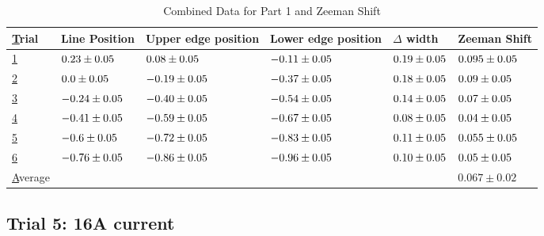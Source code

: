 \begin{table}
    \begin{adjustwidth}{-100pt}{-100pt}
        \centering
        \begin{tabular}{|l|l|l|l|l|l|}
            \hline
            {\ul Trial}   & Line Position                & Upper edge position          & Lower edge position          & $\Delta$ width              & Zeeman Shift                 \\ \hline
            {\ul 1}       & $0.23 \pm 0.05$  & $0.08 \pm 0.05$  & $-0.11 \pm 0.05$ & $0.19 \pm 0.05$ & $0.095 \pm 0.05$ \\ \hline
            {\ul 2}       & $0.0 \pm 0.05$   & $-0.19 \pm 0.05$ & $-0.37 \pm 0.05$ & $0.18 \pm 0.05$ & $0.09 \pm 0.05$  \\ \hline
            {\ul 3}       & $-0.24 \pm 0.05$ & $-0.40 \pm 0.05$ & $-0.54 \pm 0.05$ & $0.14 \pm 0.05$ & $0.07 \pm 0.05$  \\ \hline
            {\ul 4}       & $-0.41 \pm 0.05$ & $-0.59 \pm 0.05$ & $-0.67 \pm 0.05$ & $0.08 \pm 0.05$ & $0.04 \pm 0.05$  \\ \hline
            {\ul 5}       & $-0.6 \pm 0.05$  & $-0.72 \pm 0.05$ & $-0.83 \pm 0.05$ & $0.11 \pm 0.05$ & $0.055 \pm 0.05$ \\ \hline
            {\ul 6}       & $-0.76 \pm 0.05$ & $-0.86 \pm 0.05$ & $-0.96 \pm 0.05$ & $0.10 \pm 0.05$ & $0.05 \pm 0.05$  \\ \hline
            {\ul Average} &                              &                              &                              &                             & $0.067 \pm 0.02$             \\ \hline
        \end{tabular}
    \end{adjustwidth}
    \caption{Combined Data for Part 1 and Zeeman Shift}
\end{table}



\subsection{Trial 5: 16A current}


